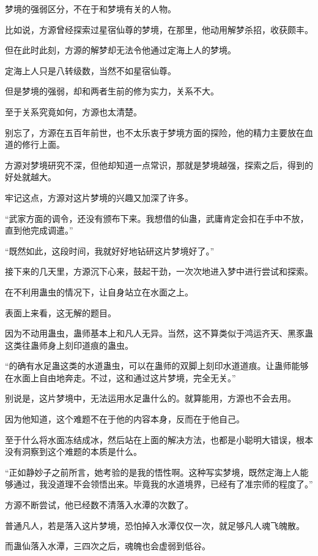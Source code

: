 \begin{this_body}
梦境的强弱区分，不在于和梦境有关的人物。

比如说，方源曾经探索过星宿仙尊的梦境，在那里，他动用解梦杀招，收获颇丰。

但在此时此刻，方源的解梦却无法令他通过定海上人的梦境。

定海上人只是八转级数，当然不如星宿仙尊。

但是梦境的强弱，却和两者生前的修为实力，关系不大。

至于关系究竟如何，方源也太清楚。

别忘了，方源在五百年前世，也不太乐衷于梦境方面的探险，他的精力主要放在血道的修行上面。

方源对梦境研究不深，但他却知道一点常识，那就是梦境越强，探索之后，得到的好处就越大。

牢记这点，方源对这片梦境的兴趣又加深了许多。

“武家方面的调令，还没有颁布下来。我想借的仙蛊，武庸肯定会扣在手中不放，直到他完成调遣。”

“既然如此，这段时间，我就好好地钻研这片梦境好了。”

接下来的几天里，方源沉下心来，鼓起干劲，一次次地进入梦中进行尝试和探索。

在不利用蛊虫的情况下，让自身站立在水面之上。

表面上来看，这无解的题目。

因为不动用蛊虫，蛊师基本上和凡人无异。当然，这不算类似于鸿运齐天、黑豕蛊这类往蛊师身上刻印道痕的蛊虫。

“的确有水足蛊这类的水道蛊虫，可以在蛊师的双脚上刻印水道道痕。让蛊师能够在水面上自由地奔走。不过，这和通过这片梦境，完全无关。”

别说是，这片梦境中，无法运用水足蛊什么的。就算能用，方源也不会去用。

因为他知道，这个难题不在于他的内容本身，反而在于他自己。

至于什么将水面冻结成冰，然后站在上面的解决方法，也都是小聪明大错误，根本没有洞察到这个难题的本质是什么。

“正如静妙子之前所言，她考验的是我的悟性啊。这种写实梦境，既然定海上人能够通过，我没道理不会领悟出来。毕竟我的水道境界，已经有了准宗师的程度了。”

方源不断尝试，他已经数不清落入水潭的次数了。

普通凡人，若是落入这片梦境，恐怕掉入水潭仅仅一次，就足够凡人魂飞魄散。

而蛊仙落入水潭，三四次之后，魂魄也会虚弱到低谷。


\end{this_body}
